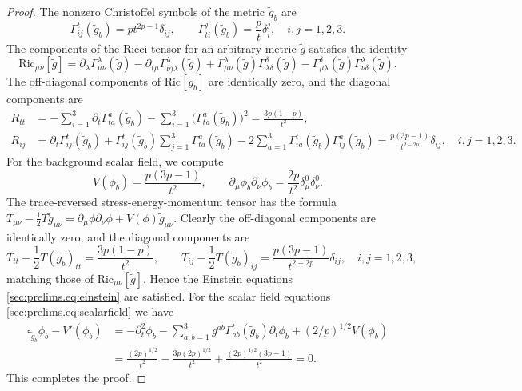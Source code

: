 \documentclass{article}
\newcommand{\Ric}{\mathrm{Ric}}
\newcommand{\wt}{\widetilde}
\newcommand{\pa}{\partial}
\begin{document}
\begin{proof}
    The nonzero Christoffel symbols of the metric $\wt{g}_b$ are
    \begin{equation}
        \Gamma_{ij}^t(\wt{g}_b) = p t^{2p-1} \delta_{ij},\qquad \Gamma_{ti}^j(\wt{g}_b) = \frac{p}{t}\delta_i^j,\quad i,j=1,2,3.
    \end{equation}
    The components of the Ricci tensor for an arbitrary metric $\wt{g}$ satisfies the identity
    \begin{equation}
        \Ric_{\mu\nu}[\wt{g}]= \pa_\lambda \Gamma_{\mu\nu}^\lambda(\wt{g}) - \pa_{(\mu}\Gamma_{\nu)\lambda}^\lambda(\wt{g}) + \Gamma_{\mu\nu}^\lambda(\wt{g})\Gamma_{\lambda\delta}^\delta(\wt{g}) - \Gamma_{\mu\lambda}^\delta(\wt{g})\Gamma_{\nu\delta}^\lambda(\wt{g}).
    \end{equation}
    The off-diagonal components of $\Ric[\wt{g}_b]$ are identically zero, and the diagonal components are
    \begin{subequations}
        \begin{align}
            R_{tt} &= -\sum_{i=1}^3\pa_t \Gamma_{ta}^a(\wt{g}_b) - \sum_{i=1}^3 \big(\Gamma_{ta}^a(\wt{g}_b)\big)^2 = \frac{3p(1-p)}{t^2},\\
            R_{ij} &= \pa_t \Gamma_{ij}^t(\wt{g}_b) + \Gamma_{ij}^t(\wt{g}_b)\sum_{j=1}^3\Gamma_{ta}^a(\wt{g}_b) - 2\sum_{a=1}^3\Gamma_{ia}^t(\wt{g}_b)\Gamma_{tj}^a(\wt{g}_b) = \frac{p(3p-1)}{t^{2-2p}}\delta_{ij},\quad i,j=1,2,3.
        \end{align}
    \end{subequations}
    For the background scalar field, we compute
    \begin{equation}
        V(\phi_b) = \frac{p(3p-1)}{t^2}, \qquad \pa_\mu \phi_b\pa_\nu\phi_b = \frac{2p}{t^2}\delta_{\mu}^0\delta_{\nu}^0.
    \end{equation}
    The trace-reversed stress-energy-momentum tensor has the formula $T_{\mu\nu} - \frac{1}{2}T\wt{g}_{\mu\nu} = \pa_\mu\phi\pa_\nu\phi + V(\phi)\wt{g}_{\mu\nu}$. Clearly the off-diagonal components are identically zero, and the diagonal components are
    \begin{equation}
        T_{tt} - \frac{1}{2}T (\wt{g}_b)_{tt} = \frac{3p(1-p)}{t^2},\qquad T_{ij} - \frac{1}{2}T(\wt{g}_b)_{ij} = \frac{p(3p-1)}{t^{2-2p}}\delta_{ij}, \quad i,j=1,2,3,
    \end{equation}
    matching those of $\Ric_{\mu\nu}[\wt{g}]$. Hence the Einstein equations \eqref{sec:prelims.eq:einstein} are satisfied. For the scalar field equations \eqref{sec:prelims.eq:scalarfield} we have
    \begin{align}
        \square_{\wt{g}_b}\phi_b - V'(\phi_b) &= -\pa_t^2 \phi_b - \sum_{a,b=1}^3g^{ab}\Gamma_{ab}^t(\wt{g}_b)\pa_t\phi_b+(2/p)^{1/2}V(\phi_b)\nonumber\\
        &=\frac{(2p)^{1/2}}{t^2} - \frac{3p(2p)^{1/2}}{t^2} + \frac{(2p)^{1/2}(3p-1)}{t^2} = 0.
    \end{align}
    This completes the proof.
\end{proof}
\end{document}
